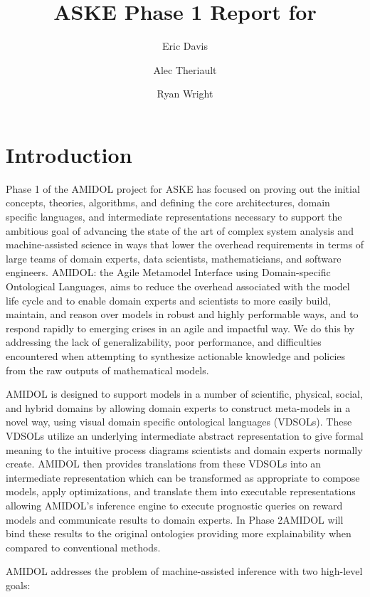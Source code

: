 \documentclass[11pt]{article}
\date{\vspace{-5ex}}
\author[1]{Eric Davis}
\author[1]{Alec Theriault}
\author[1]{Ryan Wright}
\affil[1]{Galois, Inc}
\title{ASKE Phase 1 Report for \amidol{}}
\newcommand{\amidol}{\textsc{AMIDOL}}
\begin{document}
\maketitle
\vspace{10pt}

\section{Introduction}

Phase 1 of the \amidol{} project for ASKE has focused on proving out the initial concepts, theories, algorithms, and defining the core architectures, domain specific languages, and intermediate representations necessary to support the ambitious goal of advancing the state of the art of complex system analysis and machine-assisted science in ways that lower the overhead requirements in terms of large teams of domain experts, data scientists, mathematicians, and software engineers.  \amidol{}: the Agile Metamodel Interface using Domain-specific Ontological Languages, aims to reduce the overhead associated with the model life cycle and to enable domain experts and scientists to more easily build, maintain, and reason over models in robust and highly performable ways, and to respond rapidly to emerging crises in an agile and impactful way.  We do this by addressing the lack of generalizability, poor performance, and difficulties encountered when attempting to synthesize actionable knowledge and policies from the raw outputs of mathematical models.

\amidol{} is designed to support models in a number of scientific, physical, social, and hybrid domains by allowing domain experts to construct meta-models in a novel way, using visual domain specific ontological languages (VDSOLs).  These VDSOLs utilize an underlying intermediate abstract representation to give formal meaning to the intuitive process diagrams scientists and domain experts normally create.  \amidol{} then provides translations from these VDSOLs into an intermediate representation which can be transformed as appropriate to compose models, apply optimizations, and translate them into executable representations allowing \amidol{}'s inference engine to execute prognostic queries on reward models and communicate results to domain experts. In Phase 2\amidol{} will bind these results to the original ontologies providing more explainability when compared to conventional methods.

\amidol{} addresses the problem of machine-assisted inference with two high-level goals:
\end{document}
